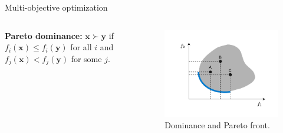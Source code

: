 \documentclass[aspectratio=169,xcolor=dvipsnames]{beamer}
\begin{document}
\begin{frame}{Multi-objective optimization}
\begin{columns}[c]
        \textbf{Pareto dominance:} \(\mathbf{x} \succ \mathbf{y}\) if \(f_i(\mathbf{x}) \leq f_i(\mathbf{y})\) for all \(i\) and \(f_j(\mathbf{x}) < f_j(\mathbf{y})\) for some \(j\).
        \begin{figure}
            \centering
            \includegraphics[width=1.0\linewidth]{imgs/pareto-front.pdf}
            \caption{Dominance and Pareto front.}
        \end{figure}



    \end{columns}
\end{frame}


\end{document}
